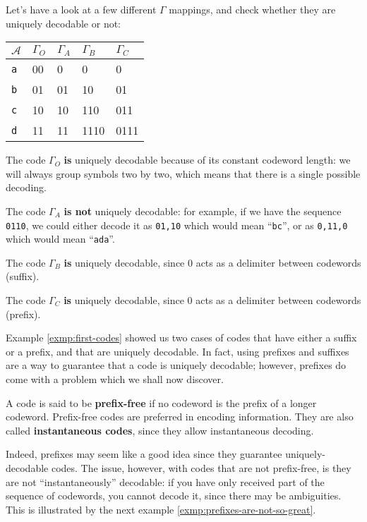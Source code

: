 \documentclass{report}
\begin{document}
\begin{exmp}\label{exmp:first-codes}
Let's have a look at a few different $\Gamma$ mappings, and check whether they are uniquely decodable or not:
\begin{center}
	\begin{tabular}{l | l l l l}
		$\mathcal A$ & $\Gamma_O$ & $\Gamma_A$ & $\Gamma_B$ & $\Gamma_C$ \\ \hline
		\texttt a & 00 & 0 & 0 & 0 \\
		\texttt b & 01 & 01 & 10 & 01 \\
		\texttt c & 10 & 10 & 110 & 011 \\
		\texttt d & 11 & 11 & 1110 & 0111
	\end{tabular}
\end{center}
The code $\Gamma_O$ \textbf{is} uniquely decodable because of its constant codeword length: we will always group symbols two by two, which means that there is a single possible decoding. \par
 \noindent The code $\Gamma_A$ \textbf{is not} uniquely decodable: for example, if we have the sequence \texttt{0110}, we could either decode it as \texttt{01,10} which would mean ``\texttt{bc}'', or as \texttt{0,11,0} which would mean ``\texttt{ada}''. \par
 \noindent The code $\Gamma_B$ \textbf{is} uniquely decodable, since 0 acts as a delimiter between codewords (suffix). \par
 \noindent The code $\Gamma_C$ \textbf{is} uniquely decodable, since 0 acts as a delimiter between codewords (prefix). 
\end{exmp}

 Example \ref{exmp:first-codes} showed us two cases of codes that have either a suffix or a prefix, and that are uniquely decodable. In fact, using prefixes and suffixes are a way to guarantee that a code is uniquely decodable; however, prefixes do come with a problem which we shall now discover.

\begin{defn}
	A code is said to be \textbf{prefix-free} if no codeword is the prefix of a longer codeword. Prefix-free codes are preferred in encoding information. They are also called \textbf{instantaneous codes}, since they allow instantaneous decoding.
\end{defn}

 Indeed, prefixes may seem like a good idea since they guarantee uniquely-decodable codes. The issue, however, with codes that are not prefix-free, is they are not ``instantaneously'' decodable: if you have only received part of the sequence of codewords, you cannot decode it, since there may be ambiguities. This is illustrated by the next example \ref{exmp:prefixes-are-not-so-great}.
\end{document}
